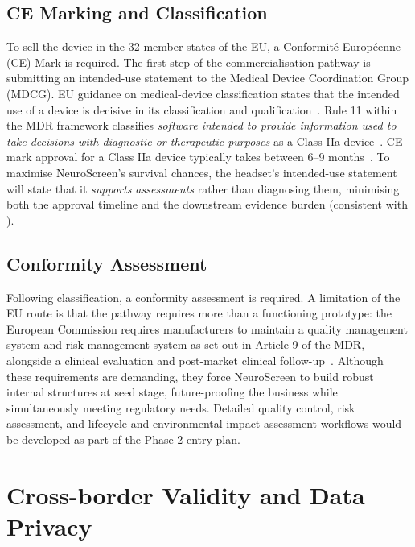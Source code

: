\subsection{CE Marking and Classification}

To sell the device in the 32 member states of the EU, a Conformit\'{e} Europ\'{e}enne (CE) Mark is required. The first step of the commercialisation pathway is submitting an intended-use statement to the Medical Device Coordination Group (MDCG). EU guidance on medical-device classification states that the intended use of a device is decisive in its classification and qualification~\cite{eu_mdcg_classification}. Rule 11 within the MDR framework classifies \emph{software intended to provide information used to take decisions with diagnostic or therapeutic purposes} as a Class IIa device~\cite{eu_mdcg_classification}. CE-mark approval for a Class IIa device typically takes between 6--9 months~\cite{medenvoy_ce_timeline}. To maximise NeuroScreen's survival chances, the headset's intended-use statement will state that it \emph{supports  assessments} rather than diagnosing them, minimising both the approval timeline and the downstream evidence burden (consistent with ).

\subsection{Conformity Assessment}

Following classification, a conformity assessment is required. A limitation of the EU route is that the pathway requires more than a functioning prototype: the European Commission requires manufacturers to maintain a quality management system and risk management system as set out in Article 9 of the MDR, alongside a clinical evaluation and post-market clinical follow-up~\cite{eu_md_manufacturers}. Although these requirements are demanding, they force NeuroScreen to build robust internal structures at seed stage, future-proofing the business while simultaneously meeting regulatory needs. Detailed quality control, risk assessment, and lifecycle and environmental impact assessment workflows would be developed as part of the Phase 2 entry plan.


\section{Cross-border Validity and Data Privacy}
\label{sec:ent-regulatory-cross-border}

